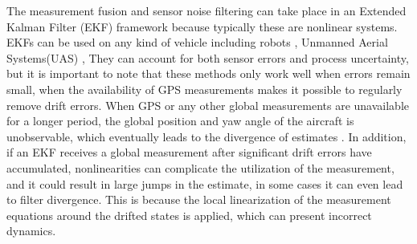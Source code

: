 The measurement fusion and sensor noise filtering can take place in an Extended Kalman Filter (EKF) framework because typically these are nonlinear systems. EKFs can be used on any kind of vehicle including robots \cite{EKF-Robot}, Unmanned Aerial Systems(UAS) \cite{EKF-UAS-1, EKF-UAS-2}, \etc They can account for both sensor errors and process uncertainty, but it is important to note that these methods only work well when errors remain small, \eg when the availability of GPS measurements makes it possible to regularly remove drift errors. When GPS or any other global measurements are unavailable for a longer period, the global position and yaw angle of the aircraft is unobservable, which eventually leads to the divergence of estimates \cite{unobservable-1, unobservable-2}. In addition, if an EKF receives a global measurement after significant drift errors have accumulated, nonlinearities can complicate the utilization of the measurement, and it could result in large jumps in the estimate, in some cases it can even lead to filter divergence. This is because the local linearization of the measurement equations around the drifted states is applied, which can present incorrect dynamics.

